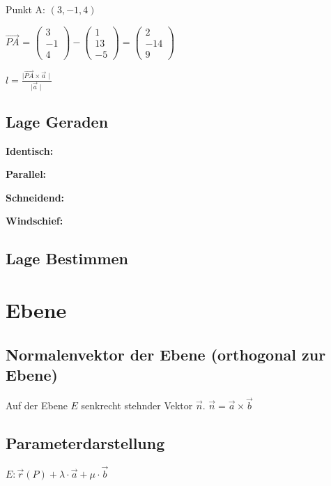 \begin{multicols*}{3}
    {Punkt A: $(3,-1,4)$}

    {$\overrightarrow{PA}$ = $\begin{pmatrix}
                3  \\
                -1 \\
                4
            \end{pmatrix} -  \begin{pmatrix}
                1  \\
                13 \\
                -5
            \end{pmatrix} =
            \begin{pmatrix}
                2   \\
                -14 \\
                9
            \end{pmatrix} $}

    {$l = \frac{\mid\overrightarrow{PA}\times\vec{a}\mid}{\mid\vec{a}\mid} $}

    \subsection{Lage Geraden}

    \textbf{Identisch:}

    \textbf{Parallel:}

    \textbf{Schneidend:}

    \textbf{Windschief:}

    \subsection{Lage Bestimmen}


    \section{Ebene}
    \subsection{Normalenvektor der Ebene (orthogonal zur Ebene)}
    {Auf der Ebene $ E $ senkrecht stehnder Vektor $\vec{n}$.}
    $\vec{n} = \vec{a} \times \vec{b}$

    \subsection{Parameterdarstellung}

    {\large $ E: \vec{r}(P) + \lambda \cdot \vec{a} + \mu \cdot \vec{b} $}


\end{multicols*}
